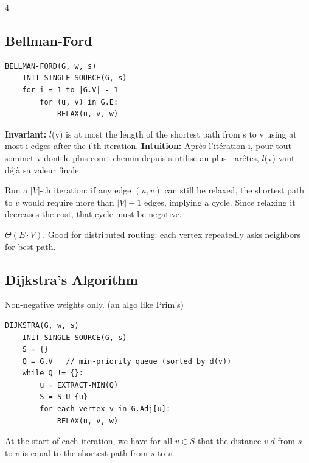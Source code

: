 \documentclass[8pt,a4paper,landscape]{extarticle}
\begin{document}
\begin{multicols*}{4}
\subsection{Bellman-Ford}

\begin{lstlisting}
BELLMAN-FORD(G, w, s)
    INIT-SINGLE-SOURCE(G, s)
    for i = 1 to |G.V| - 1
        for (u, v) in G.E: 
            RELAX(u, v, w)
\end{lstlisting}

\begin{thm}[title=Correctness]
\textbf{Invariant:} $l$(v) is at most the length of the shortest path from s to v using at most i edges after the i’th iteration. 
\textbf{Intuition:} Après l'itération i, pour tout sommet v dont le plus court chemin depuis s utilise au plus i arêtes, $l$(v) vaut déjà sa valeur finale.
\end{thm}

\begin{prop}[title=Negative cycle detection]
Run a $|V|$-th iteration: if any edge $(u,v)$ can still be relaxed, the shortest path to $v$ would require more than $|V|-1$ edges, implying a cycle. Since relaxing it decreases the cost, that cycle must be negative.
\end{prop}

\begin{prop}[title=Runtime]
$\Theta(E\cdot V)$. Good for distributed routing: each vertex repeatedly asks neighbors for best path.
\end{prop}

\subsection{Dijkstra's Algorithm}
Non-negative weights only. (an algo like Prim's)

\begin{lstlisting}
DIJKSTRA(G, w, s)
    INIT-SINGLE-SOURCE(G, s)
    S = {}
    Q = G.V   // min-priority queue (sorted by d(v))
    while Q != {}:
        u = EXTRACT-MIN(Q)
        S = S U {u}
        for each vertex v in G.Adj[u]:
            RELAX(u, v, w)
\end{lstlisting}

\begin{thm}[title=Loop invariant (correctness)]
At the start of each iteration, we have for all $v \in S$ that the distance $v.d$ from $s$ to $v$ is equal to the shortest path from $s$ to $v$.
\end{thm}


\end{multicols*}
\end{document}
